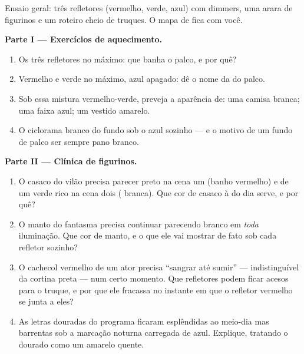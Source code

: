 \begin{problem}\label{pb:g8:colors-spectra:1}
Ensaio geral: três refletores (vermelho, verde, azul) com dimmers, uma
arara de figurinos e um roteiro cheio de truques. O mapa de  fica
com você.

\medskip\noindent\textbf{Parte I --- Exercícios de aquecimento.}
\begin{enumerate}
  \item Os três refletores no máximo: que  banha o palco, e por
        quê?
  \item Vermelho e verde no máximo, azul apagado: dê o nome da  do
        palco.
  \item Sob essa mistura vermelho-verde, preveja a aparência de: uma
        camisa branca; uma faixa azul; um vestido amarelo.
  \item O ciclorama branco do fundo sob o azul sozinho --- e o motivo
        de um fundo de palco ser sempre pano branco.
\end{enumerate}

\medskip\noindent\textbf{Parte II --- Clínica de figurinos.}
\begin{enumerate}[resume]
  \item O casaco do vilão precisa parecer preto na cena um (banho
        vermelho) e de um verde rico na cena dois ( branca). Que
        cor de casaco à  do dia serve, e por quê?
  \item O manto do fantasma precisa continuar parecendo branco em
        \emph{toda} iluminação. Que cor de manto, e o que ele vai
        mostrar de fato sob cada refletor sozinho?
  \item O cachecol vermelho de um ator precisa ``sangrar até sumir''
        --- indistinguível da cortina preta --- num certo momento.
        Que refletores podem ficar acesos para o truque, e por que
        ele fracassa no instante em que o refletor vermelho se junta
        a eles?
  \item As letras douradas do programa ficaram esplêndidas ao
        meio-dia mas barrentas sob a marcação noturna carregada de
        azul. Explique, tratando o dourado como um amarelo quente.
\end{enumerate}


\end{problem}
